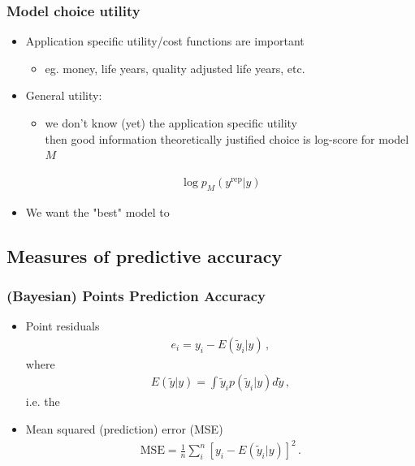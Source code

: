 \documentclass[10pt]{beamer}
\begin{document}
\begin{frame}

\frametitle{Model choice utility}
  \begin{itemize}
  \item Application specific utility/cost functions are important
    \begin{itemize}
      \item eg. money, life years, quality adjusted life years, etc.
    \end{itemize}
  \pause
  \item General utility: 
  \begin{itemize}
    \item we don't know (yet) the application specific utility\\
    then good information theoretically justified choice is log-score for model $M$
  \end{itemize}
      \begin{align*}
        \log p_M (y^\text{rep} | y)
      \end{align*}
    \pause
    \item We want the "best" model to 
\end{itemize}

\end{frame}

\subsection{Measures of predictive accuracy}
\frame{\subsectionpage}

\begin{frame}

\frametitle{(Bayesian) Points Prediction Accuracy}

    \begin{itemize}
      \item Point residuals
      \begin{align*}
        e_i =  y_i - E(\tilde{y}_i|y)\,,
      \end{align*}
      where
      \begin{align*}
        E(\tilde{y}|y) = \int \tilde{y}_i p(\tilde{y}_i|y) d\tilde{y}\,,
      \end{align*}
      i.e. the 
      \pause
      \item Mean squared (prediction) error (MSE)
      \begin{align*}
        \text{MSE} = \frac{1}{n}\sum^n_i [y_i - E(\tilde{y}_i|y)]^2 \,.
      \end{align*}
    \end{itemize}

\end{frame}
\end{document}
